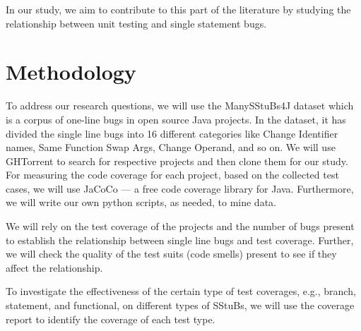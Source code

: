 \documentclass[11pt]{article}
\begin{document}
In our study, we aim to contribute to this part of the literature by studying the relationship between unit testing and single statement bugs.



\section{Methodology}

To address our research questions, we will use the ManySStuBs4J\cite{karampatsis2020often} dataset which is a corpus of one-line bugs in open source Java projects. In the dataset, it has divided the single line bugs into 16 different categories like Change Identifier names, Same Function Swap Args, Change Operand, and so on. We will use GHTorrent \cite{Gousi13} to search for respective projects and then clone them for our study. For measuring the code coverage for each project, based on the collected test cases, we will use JaCoCo — a free code coverage library for Java. Furthermore, we will write our own python scripts, as needed, to mine data.

We will rely on the test coverage of the projects and the number of bugs present to establish the relationship between single line bugs and test coverage. Further, we will check the quality of the test suits (code smells) present to see if they affect the relationship.

To investigate the effectiveness of the certain type of test coverages, e.g., branch, statement, and functional, on different types of SStuBs, we will use the coverage report to identify the coverage of each test type.




\end{document}
